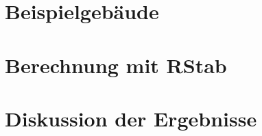 \section{Beispielgebäude}
\label{sec:besipielgebaude}

\pagebreak

\section{Berechnung mit RStab}
\label{sec:rstab}

\pagebreak

\section{Diskussion der Ergebnisse}
\label{sec:diskussion}

\pagebreak